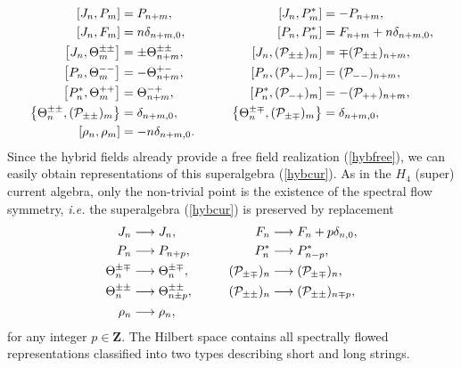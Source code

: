 \documentclass[a4paper,seceq,preprint]{ptptex}
\begin{document}
\begin{alignat}{2}
  \left[J_n,P_m\right]&=P_{n+m},&\qquad
  \left[J_n,P^*_m\right]&=-P_{n+m},\nonumber\\
  \left[J_n,F_m\right]&=n\delta_{n+m,0},&\qquad 
  \left[P_n,P^*_m\right]&=F_{n+m}+n\delta_{n+m,0},\nonumber\\
  \left[J_n,\Theta^{\pm\pm}_m\right]&=\pm\Theta^{\pm\pm}_{n+m},&\qquad
  \left[J_n,({\cal P}_{\pm\pm})_m\right]&=\mp({\cal
  P}_{\pm\pm})_{n+m},\nonumber\\
  \left[P_n,\Theta^{--}_m\right]&=-\Theta^{+-}_{n+m},&\qquad 
  \left[P_n,({\cal P}_{+-})_m\right]&=({\cal P}_{--})_{n+m},\nonumber\\
  \left[P^*_n,\Theta^{++}_m\right]&=\Theta^{-+}_{n+m},&\qquad
  \left[P^*_n,({\cal P}_{-+})_m\right]&=-({\cal P}_{++})_{n+m},\nonumber\\
  \left\{\Theta^{\pm\pm}_n,({\cal P}_{\pm\pm})_m\right\}&=\delta_{n+m,0},
&\qquad
  \left\{\Theta^{\pm\mp}_n,({\cal P}_{\pm\mp})_m\right\}&=\delta_{n+m,0},
\nonumber\\
\left[\rho_n,\rho_m\right]&=-n\delta_{n+m,0}.&&\label{hybcur}
\end{alignat}
Since the hybrid fields already provide a free field 
realization (\ref{hybfree}), we can easily obtain 
representations of this superalgebra (\ref{hybcur}).
As in the $H_4$ (super) current algebra,\cite{KK,KP}\cite{HS2}
only the non-trivial point is the existence of the spectral flow
symmetry, {\it i.e.} the superalgebra (\ref{hybcur}) is 
preserved by replacement
\begin{alignat}{2}
  J_n&\longrightarrow J_n,&\qquad
  F_n&\longrightarrow F_n+p\delta_{n,0},\nonumber\\
  P_n&\longrightarrow P_{n+p},&\qquad
  P^*_n&\longrightarrow P^*_{n-p},\nonumber\\
  \Theta^{\pm\mp}_n&\longrightarrow\Theta^{\pm\mp}_n,&\qquad
  ({\cal P}_{\pm\mp})_n&\longrightarrow ({\cal P}_{\pm\mp})_n,\nonumber\\
  \Theta^{\pm\pm}_n&\longrightarrow\Theta^{\pm\pm}_{n\pm p},&\qquad
  ({\cal P}_{\pm\pm})_n&\longrightarrow ({\cal P}_{\pm\pm})_{n\mp p},
\nonumber\\
 \rho_n&\longrightarrow\rho_n,& &
\label{spcf}
\end{alignat}
for any integer $p\in\mathbf{Z}$.
The Hilbert space contains all spectrally flowed representations 
classified into two types describing short and long strings.\cite{KP}
\end{document}

